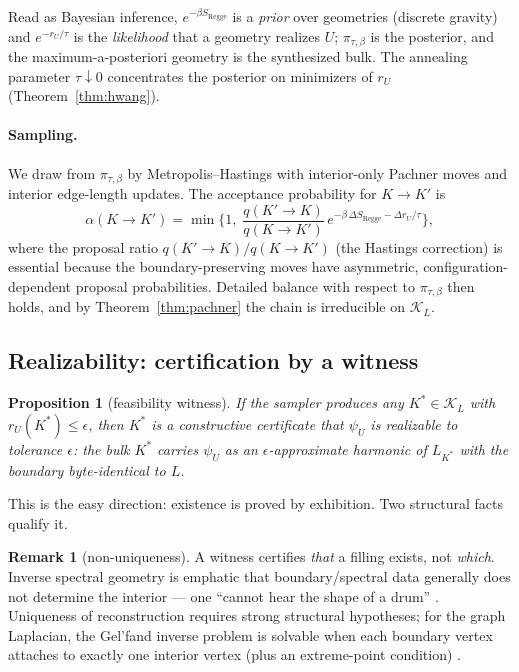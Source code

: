 \documentclass[11pt]{article}
\newcommand{\KK}{\mathcal{K}}
\theoremstyle{definition}
\newtheorem{remark}[definition]{Remark}
\theoremstyle{plain}
\newtheorem{proposition}[definition]{Proposition}
\begin{document}
Read as Bayesian inference, $e^{-\beta S_{\mathrm{Regge}}}$ is a \emph{prior} over
geometries (discrete gravity) and $e^{-r_U/\tau}$ is the \emph{likelihood} that a geometry
realizes $U$; $\pi_{\tau,\beta}$ is the posterior, and the maximum-a-posteriori geometry is
the synthesized bulk. The annealing parameter $\tau\downarrow 0$ concentrates the posterior
on minimizers of $r_U$ (Theorem~\ref{thm:hwang}).

\paragraph{Sampling.} We draw from $\pi_{\tau,\beta}$ by Metropolis--Hastings with
interior-only Pachner moves and interior edge-length updates. The acceptance probability for
$K\to K'$ is
\begin{equation}
\alpha(K\to K')=\min\!\Big\{1,\;
\frac{q(K'\!\to K)}{q(K\to K')}\,
e^{-\beta\,\Delta S_{\mathrm{Regge}}-\Delta r_U/\tau}\Big\},
\label{eq:accept}
\end{equation}
where the proposal ratio $q(K'\!\to K)/q(K\to K')$ (the Hastings correction) is essential
because the boundary-preserving moves have asymmetric, configuration-dependent proposal
probabilities. Detailed balance with respect to $\pi_{\tau,\beta}$ then holds, and by
Theorem~\ref{thm:pachner} the chain is irreducible on $\KK_L$.

\subsection{Realizability: certification by a witness}

\begin{proposition}[feasibility witness]
\label{prop:witness}
If the sampler produces any $K^{*}\in\KK_L$ with $r_U(K^{*})\le\epsilon$, then $K^{*}$ is a
constructive certificate that $\psi_U$ is realizable to tolerance $\epsilon$: the bulk
$K^{*}$ carries $\psi_U$ as an $\epsilon$-approximate harmonic of $L_{K^{*}}$ with the
boundary byte-identical to $L$.
\end{proposition}

This is the easy direction: existence is proved by exhibition. Two structural facts qualify
it.

\begin{remark}[non-uniqueness]
A witness certifies \emph{that} a filling exists, not \emph{which}. Inverse spectral
geometry is emphatic that boundary/spectral data generally does not determine the interior
--- one ``cannot hear the shape of a drum'' \cite{gww1992}. Uniqueness of reconstruction
requires strong structural hypotheses; for the graph Laplacian, the Gel'fand inverse
problem is solvable when each boundary vertex attaches to exactly one interior vertex (plus
an extreme-point condition) \cite{blasten2021}.
\end{remark}
\end{document}
